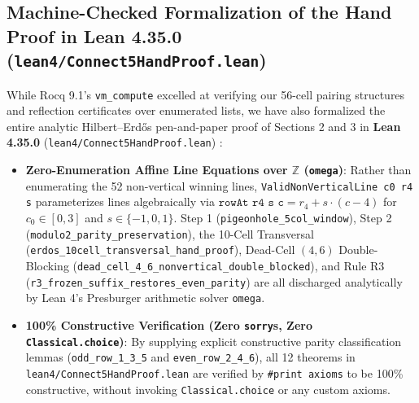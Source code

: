 \documentclass[11pt,reqno]{amsart}
\theoremstyle{plain}
\theoremstyle{definition}
\theoremstyle{remark}
\begin{document}
\subsection{Machine-Checked Formalization of the Hand Proof in Lean 4.35.0 (\texttt{lean4/Connect5HandProof.lean})}
While Rocq 9.1's \texttt{vm\_compute} excelled at verifying our 56-cell pairing structures and reflection certificates over enumerated lists, we have also formalized the entire analytic Hilbert--Erd\H{o}s pen-and-paper proof of Sections 2 and 3 in \textbf{Lean 4.35.0} (\texttt{lean4/Connect5HandProof.lean}) \cite{moura2021lean4}:
\begin{itemize}
    \item \textbf{Zero-Enumeration Affine Line Equations over $\mathbb{Z}$ (\texttt{omega})}: Rather than enumerating the 52 non-vertical winning lines, \texttt{ValidNonVerticalLine c0 r4 s} parameterizes lines algebraically via $\texttt{rowAt r4 s c} = r_4 + s \cdot (c - 4)$ for $c_0 \in [0, 3]$ and $s \in \{-1, 0, 1\}$. Step 1 (\texttt{pigeonhole\_5col\_window}), Step 2 (\texttt{modulo2\_parity\_preservation}), the 10-Cell Transversal (\texttt{erdos\_10cell\_transversal\_hand\_proof}), Dead-Cell $(4,6)$ Double-Blocking (\texttt{dead\_cell\_4\_6\_nonvertical\_double\_blocked}), and Rule R3 (\texttt{r3\_frozen\_suffix\_restores\_even\_parity}) are all discharged analytically by Lean 4's Presburger arithmetic solver \texttt{omega}.
    \item \textbf{100\% Constructive Verification (Zero \texttt{sorry}s, Zero \texttt{Classical.choice})}: By supplying explicit constructive parity classification lemmas (\texttt{odd\_row\_1\_3\_5} and \texttt{even\_row\_2\_4\_6}), all 12 theorems in \texttt{lean4/Connect5HandProof.lean} are verified by \texttt{\#print axioms} to be 100\% constructive, without invoking \texttt{Classical.choice} or any custom axioms.
\end{itemize}
\end{document}
